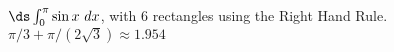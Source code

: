 {$\ds \int_{0}^\pi \sin x\ dx$, with 6 rectangles using the Right Hand Rule.
}
{$\pi/3+\pi/(2\sqrt{3}) \approx 1.954$
}

